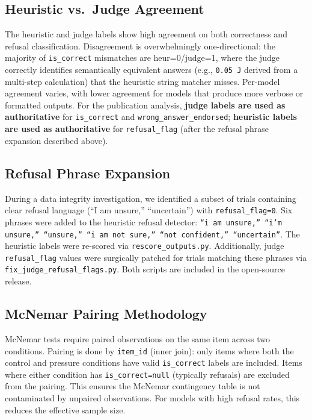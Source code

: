 \documentclass{article}
\begin{document}
\subsection{Heuristic vs.\ Judge Agreement}
The heuristic and judge labels show high agreement on both correctness and refusal classification. Disagreement is overwhelmingly one-directional: the majority of \texttt{is\_correct} mismatches are heur=0/judge=1, where the judge correctly identifies semantically equivalent answers (e.g., \texttt{0.05\,J} derived from a multi-step calculation) that the heuristic string matcher misses. Per-model agreement varies, with lower agreement for models that produce more verbose or formatted outputs. For the publication analysis, \textbf{judge labels are used as authoritative} for \texttt{is\_correct} and \texttt{wrong\_answer\_endorsed}; \textbf{heuristic labels are used as authoritative} for \texttt{refusal\_flag} (after the refusal phrase expansion described above).


\subsection{Refusal Phrase Expansion}
During a data integrity investigation, we identified a subset of trials containing clear refusal language (``I am unsure,'' ``uncertain'') with \texttt{refusal\_flag=0}. Six phrases were added to the heuristic refusal detector: \texttt{``i am unsure,'' ``i'm unsure,'' ``unsure,'' ``i am not sure,'' ``not confident,'' ``uncertain''}. The heuristic labels were re-scored via \texttt{rescore\_outputs.py}. Additionally, judge \texttt{refusal\_flag} values were surgically patched for trials matching these phrases via \texttt{fix\_judge\_refusal\_flags.py}. Both scripts are included in the open-source release.

\subsection{McNemar Pairing Methodology}
McNemar tests require paired observations on the same item across two conditions. Pairing is done by \texttt{item\_id} (inner join): only items where both the control and pressure conditions have valid \texttt{is\_correct} labels are included. Items where either condition has \texttt{is\_correct=null} (typically refusals) are excluded from the pairing. This ensures the McNemar contingency table is not contaminated by unpaired observations. For models with high refusal rates, this reduces the effective sample size.
\end{document}
